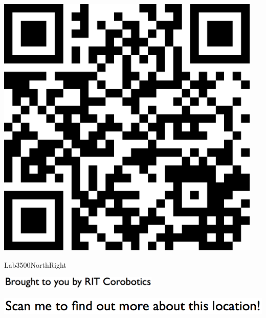 \documentclass[letterpaper]{article}
\begin{document}
 \begingroup 
 \centerline{\includegraphics[scale=1,width=5in,height=5in]{Lab3500NorthRight.png}} 
 \endgroup 
 \vspace*{\fill} 

 \hfill{\small Lab3500NorthRight} 

  \vspace{0.7in} 
 
 \centerline{\includegraphics[scale=1,width=3in]{text-bottom.png}} 
 
 \pagebreak 
{} 
 \vspace*{\fill} 
 
  \centerline{\includegraphics[scale=1,width=6in]{text-top.png}} 
 
 \vspace{0.5in} 
 
\end{document}
